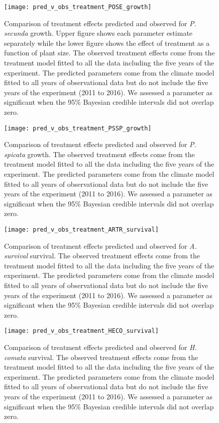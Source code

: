 \documentclass[11pt]{article}
\begin{document}
\begin{figure}[!htbp]
	\centering
	\texttt{[image: pred\_v\_obs\_treatment\_POSE\_growth]}
	\caption{Comparison of treatment effects predicted and observed for \textit{P. secunda} growth.  Upper figure shows each parameter estimate separately while the lower figure shows the effect of treatment as a function of plant size.  The observed treatment effects come from the treatment model fitted to all the data including the five years of the experiment.  The predicted parameters come from the climate model fitted to all years of observational data but do not include the five years of the experiment (2011 to 2016). We assessed a parameter as significant when the 95\% Bayesian credible intervals did not overlap zero.}
	\label{fig:parPredPOSEGrowth}
\end{figure}


\begin{figure}[!htbp]
	\centering
	\texttt{[image: pred\_v\_obs\_treatment\_PSSP\_growth]}
	\caption{Comparison of treatment effects predicted and observed for \textit{P. spicata} growth.  The observed treatment effects come from the treatment model fitted to all the data including the five years of the experiment.  The predicted parameters come from the climate model fitted to all years of observational data but do not include the five years of the experiment (2011 to 2016). We assessed a parameter as significant when the 95\% Bayesian credible intervals did not overlap zero.}
	\label{fig:parPredPSSPGrowth}
\end{figure}


\begin{figure}[!htbp]
	\centering
	\texttt{[image: pred\_v\_obs\_treatment\_ARTR\_survival]}
	\caption{Comparison of treatment effects predicted and observed for \textit{A. survival} survival.  The observed treatment effects come from the treatment model fitted to all the data including the five years of the experiment.  The predicted parameters come from the climate model fitted to all years of observational data but do not include the five years of the experiment (2011 to 2016). We assessed a parameter as significant when the 95\% Bayesian credible intervals did not overlap zero.}
	\label{fig:parPredARTRSurvival}
\end{figure}

\begin{figure}[!htbp]
	\centering
	\texttt{[image: pred\_v\_obs\_treatment\_HECO\_survival]}
	\caption{Comparison of treatment effects predicted and observed for \textit{H. comata} survival.  The observed treatment effects come from the treatment model fitted to all the data including the five years of the experiment.  The predicted parameters come from the climate model fitted to all years of observational data but do not include the five years of the experiment (2011 to 2016). We assessed a parameter as significant when the 95\% Bayesian credible intervals did not overlap zero.}
	\label{fig:parPredHECOSurvival}
\end{figure}
\end{document}
